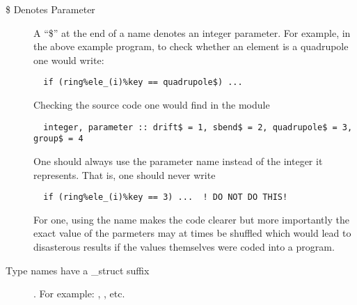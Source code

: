 \begin{description}
\item[\$ Denotes Parameter] A ``\$'' at the end of a name denotes an 
integer parameter. For example, in the above example program, to check
whether an element is a quadrupole one would write:
\begin{verbatim}
  if (ring%ele_(i)%key == quadrupole$) ...
\end{verbatim}
Checking the source code one would find in the module \bmadstruct\
\begin{verbatim}
  integer, parameter :: drift$ = 1, sbend$ = 2, quadrupole$ = 3, group$ = 4
\end{verbatim}
One should always use the parameter name instead of the integer it represents.
That is, one should never write
\begin{verbatim}
  if (ring%ele_(i)%key == 3) ...  ! DO NOT DO THIS!
\end{verbatim}
For one, using the name makes the code clearer but more importantly
the exact value of the parmeters may at times be shuffled which would
lead to disasterous results if the values themselves were coded into a
program.

\item[ Type names have a \_struct suffix]. For example: \ringstruct, 
\elestruct, etc.


\end{description}
